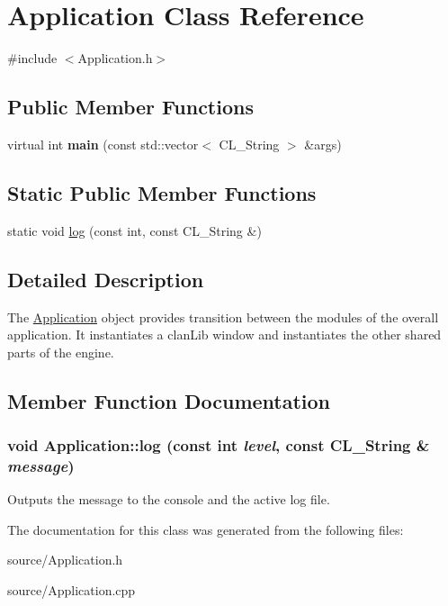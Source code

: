 \hypertarget{classApplication}{
\section{Application Class Reference}
\label{classApplication}
}


{\ttfamily \#include $<$Application.h$>$}

\subsection*{Public Member Functions}
\begin{DoxyCompactItemize}
\item 
\hypertarget{classApplication_abbda0eddef2dd5fcce957a82373ecb6c}{
virtual int {\bfseries main} (const std::vector$<$ CL\_\-String $>$ \&args)}
\label{classApplication_abbda0eddef2dd5fcce957a82373ecb6c}

\end{DoxyCompactItemize}
\subsection*{Static Public Member Functions}
\begin{DoxyCompactItemize}
\item 
static void \hyperlink{classApplication_a1112e5aede67cff7aad4c8fb4be3e3af}{log} (const int, const CL\_\-String \&)
\end{DoxyCompactItemize}


\subsection{Detailed Description}
The \hyperlink{classApplication}{Application} object provides transition between the modules of the overall application. It instantiates a clanLib window and instantiates the other shared parts of the engine. 

\subsection{Member Function Documentation}
\hypertarget{classApplication_a1112e5aede67cff7aad4c8fb4be3e3af}{
\subsubsection[{log}]{\setlength{\rightskip}{0pt plus 5cm}void Application::log (const int {\em level}, \/  const CL\_\-String \& {\em message})}}
\label{classApplication_a1112e5aede67cff7aad4c8fb4be3e3af}
Outputs the message to the console and the active log file. 

The documentation for this class was generated from the following files:\begin{DoxyCompactItemize}
\item 
source/Application.h\item 
source/Application.cpp\end{DoxyCompactItemize}
